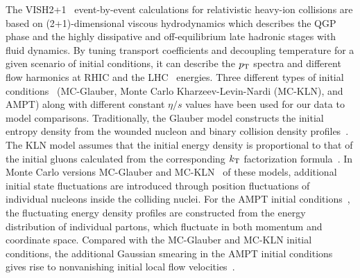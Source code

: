 The VISH2+1~\cite{Shen:2010uy,Shen:2014vra} event-by-event calculations for relativistic heavy-ion collisions are based on (2+1)-dimensional viscous hydrodynamics which describes the QGP phase and the highly dissipative and off-equilibrium late hadronic stages with fluid dynamics. By tuning transport coefficients and decoupling temperature for a given scenario of initial conditions, it can describe the $p_{\rm T}$ spectra and different flow harmonics at RHIC and the LHC~\cite{Qiu:2011hf, Shen:2010uy, Shen:2011eg, Bhalerao:2015iya} energies.
Three different types of initial conditions~\cite{Zhu:2016puf} ({MC-Glauber}, Monte Carlo Kharzeev-Levin-Nardi ({MC-KLN}), and {AMPT}) along with different constant $\eta/s$ values have been used for our data to model comparisons.
Traditionally, the Glauber model constructs the initial entropy density from the wounded nucleon and binary collision density profiles~\cite{Kolb:2000sd}. The {KLN} model assumes that the initial energy density is proportional to that of the initial gluons calculated from the corresponding $k_{\rm T}$ factorization formula~\cite{Kharzeev:2000ph}.
In Monte Carlo versions {MC-Glauber} and {MC-KLN}~\cite{Miller:2007ri,Drescher:2006ca,Hirano:2009ah} of these models, additional initial state fluctuations are introduced through position fluctuations of individual nucleons inside the colliding nuclei. For the {AMPT} initial conditions~\cite{Bhalerao:2015iya,Pang:2012he,Xu:2016hmp}, the fluctuating energy density profiles are constructed from the energy distribution of individual partons, which fluctuate in both momentum and coordinate space. Compared with the {MC-Glauber} and {MC-KLN} initial conditions, the additional Gaussian smearing in the {AMPT} initial conditions gives rise to nonvanishing initial local flow velocities~\cite{Pang:2012he}. 


